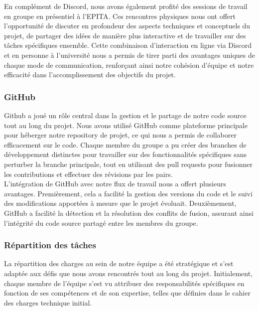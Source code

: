 En complément de Discord, nous avons également profité des sessions de travail en groupe en présentiel à l'EPITA. Ces rencontres physiques nous ont offert l'opportunité de discuter en profondeur des aspects techniques et conceptuels du projet, de partager des idées de manière plus interactive et de travailler sur des tâches spécifiques ensemble. Cette combinaison d'interaction en ligne via Discord et en personne à l'université nous a permis de tirer parti des avantages uniques de chaque mode de communication, 
renforçant ainsi notre cohésion d'équipe et notre efficacité dans l'accomplissement des objectifs du projet. 
\\



\subsubsection{GitHub}

Github a joué un rôle central dans la gestion et le partage de notre code source tout au long du projet. 
Nous avons utilisé GitHub comme plateforme principale pour héberger notre repository de projet, ce qui nous a permis de collaborer efficacement sur le code. 
Chaque membre du groupe a pu créer des branches de développement distinctes pour travailler sur des fonctionnalités spécifiques sans perturber la branche principale, tout en utilisant des pull requests pour fusionner les contributions et effectuer des révisions par les pairs.
\\

L'intégration de GitHub avec notre flux de travail nous a offert plusieurs avantages. 
Premièrement, cela a facilité la gestion des versions du code et le suivi des modifications apportées à mesure que le projet évoluait. 
Deuxièmement, GitHub a facilité la détection et la résolution des conflits de fusion, assurant ainsi l'intégrité du code source partagé entre les membres du groupe. 
\\
\subsubsection{Répartition des tâches }


La répartition des charges au sein de notre équipe a été stratégique et s'est adaptée aux défis que nous avons rencontrés tout au long du projet.
 Initialement, chaque membre de l'équipe s'est vu attribuer des responsabilités spécifiques en fonction de ses compétences et de son expertise, 
 telles que définies dans le cahier des charges technique initial.
\\ 

